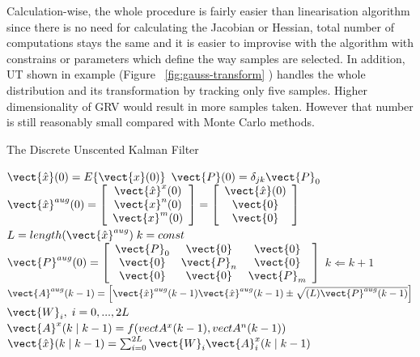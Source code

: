 Calculation-wise, the whole procedure is fairly easier than linearisation algorithm since there is no need for calculating the Jacobian or Hessian, total number of computations stays the same and it is easier to improvise with the algorithm with constrains or parameters which define the way samples are selected. In addition, UT shown in example (Figure ~\ref{fig:gauss-transform} ) handles the whole distribution and its transformation by tracking only five samples. Higher dimensionality of GRV would result in more samples taken. However that number is still reasonably small compared with Monte Carlo methods.
\begin{algorithm}%
\caption{The Discrete Unscented Kalman Filter} \label{alg:ukf}
\begin{algorithmic}
\REQUIRE $\vect{\hat{x}}(0) = E\lbrace \vect{x}(0) \rbrace$
\REQUIRE $\vect{P}(0) = \delta_{jk} \vect{P}_{0} $ 
\REQUIRE $\vect{\hat{x}}^{aug}(0) = \left[ \begin{array}{c} \vect{\hat{x}}^{x}(0) \\ \vect{x}^{n}(0) \\ \vect{x}^{m}(0) \end{array} \right]
                                  = \left[ \begin{array}{c} \vect{\hat{x}}(0) \\ \vect{0} \\ \vect{0} \end{array} \right] $ 
\STATE   $L = length(\vect{\hat{x}}^{aug}) \; k = const$
\REQUIRE $\vect{P}^{aug}(0) = \left[ \begin{array}{ccc} \vect{P}_{0} & \vect{0}     & \vect{0} \\ 
															\vect{0} & \vect{P}_{n} & \vect{0} \\
															\vect{0} & \vect{0}     & \vect{P}_{m} \end{array} \right] $ 
\LOOP
	\STATE $k \Leftarrow k+1$
	\STATE $\vect{A}^{aug}(k-1) = \left[\vect{\hat{x}}^{aug}(k-1) \vect{\hat{x}}^{aug}(k-1)\pm \sqrt{(L)\vect{P}^{aug}(k-1)}  \right] $
	\STATE   $ \vect{W}_{i}, \; i = 0,...,2L $
	\STATE   $\vect{A}^{x}(k \mid k-1) = f(vect{A}^{x}(k-1), vect{A}^{n}(k-1)) $
	\STATE	 $ \vect{\hat{x}}(k \mid k-1) = \sum_{i=0}^{2L} \vect{W}_{i} \vect{A}^{x}_{i}(k \mid k-1) $

\end{algorithmic}
\end{algorithm}
